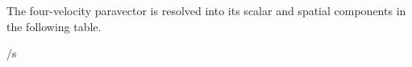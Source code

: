 \noindent The four-velocity paravector is resolved into its scalar and spatial components in the following table.
\begin{componenttable}{\dd{}/\dd s}
\end{componenttable}
